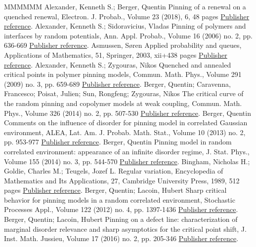 \begin{thebibliography}{MMMMMM}
 Alexander, Kenneth S.; Berger, Quentin Pinning of a renewal on a quenched renewal, Electron. J. Probab., Volume 23 (2018), 6, 48 pages \href{https://ahl.centre-mersenne.org/item/AHL_2019__2__281_0/#A17_1}{Publisher reference}.
 Alexander, Kenneth S.; Sidoravicius, Vladas Pinning of polymers and interfaces by random potentials, Ann. Appl. Probab., Volume 16 (2006) no. 2, pp. 636-669 \href{https://ahl.centre-mersenne.org/item/AHL_2019__2__281_0/#AS06}{Publisher reference}.
 Asmussen, Søren Applied probability and queues, Applications of Mathematics, 51, Springer, 2003, xii+438 pages \href{https://ahl.centre-mersenne.org/item/AHL_2019__2__281_0/#A2003}{Publisher reference}.
 Alexander, Kenneth S.; Zygouras, Nikos Quenched and annealed critical points in polymer pinning models, Commun. Math. Phys., Volume 291 (2009) no. 3, pp. 659-689 \href{https://ahl.centre-mersenne.org/item/AHL_2019__2__281_0/#AZ09}{Publisher reference}.
 Berger, Quentin; Caravenna, Francesco; Poisat, Julien; Sun, Rongfeng; Zygouras, Nikos The critical curve of the random pinning and copolymer models at weak coupling, Commun. Math. Phys., Volume 326 (2014) no. 2, pp. 507-530 \href{https://ahl.centre-mersenne.org/item/AHL_2019__2__281_0/#BCPSZ14}{Publisher reference}.
 Berger, Quentin Comments on the influence of disorder for pinning model in correlated Gaussian environment, ALEA, Lat. Am. J. Probab. Math. Stat., Volume 10 (2013) no. 2, pp. 953-977 \href{https://ahl.centre-mersenne.org/item/AHL_2019__2__281_0/#B13}{Publisher reference}.
 Berger, Quentin Pinning model in random correlated environment: appearance of an infinite disorder regime, J. Stat. Phys., Volume 155 (2014) no. 3, pp. 544-570 \href{https://ahl.centre-mersenne.org/item/AHL_2019__2__281_0/#B14}{Publisher reference}.
 Bingham, Nicholas H.; Goldie, Charles M.; Teugels, Jozef L. Regular variation, Encyclopedia of Mathematics and Its Applications, 27, Cambridge University Press, 1989, 512 pages \href{https://ahl.centre-mersenne.org/item/AHL_2019__2__281_0/#BGT89}{Publisher reference}.
 Berger, Quentin; Lacoin, Hubert Sharp critical behavior for pinning models in a random correlated environment, Stochastic Processes Appl., Volume 122 (2012) no. 4, pp. 1397-1436 \href{https://ahl.centre-mersenne.org/item/AHL_2019__2__281_0/#BL12}{Publisher reference}.
 Berger, Quentin; Lacoin, Hubert Pinning on a defect line: characterization of marginal disorder relevance and sharp asymptotics for the critical point shift, J. Inst. Math. Jussieu, Volume 17 (2016) no. 2, pp. 205-346 \href{https://ahl.centre-mersenne.org/item/AHL_2019__2__281_0/#BL15}{Publisher reference}.

\end{thebibliography}
